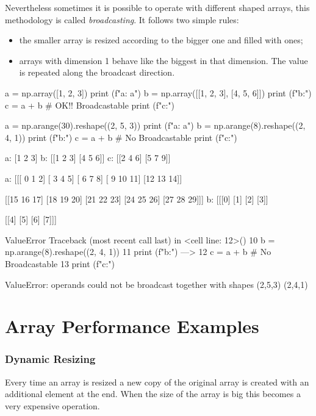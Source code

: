 Nevertheless sometimes it is possible to operate with different shaped arrays, this methodology is called \emph{broadcasting}. It follows two simple rules:
\begin{itemize}
\item the smaller array is resized according to the bigger one and filled with ones;
\item arrays with dimension 1 behave like the biggest in that dimension. The value is repeated along the broadcast direction.
\end{itemize}

\begin{ipythonnon}
a = np.array([1, 2, 3])
print (f"a: {a}")
b = np.array([[1, 2, 3], [4, 5, 6]])
print (f"b:")
c = a + b # OK!! Broadcastable
print (f"c:")
 
a = np.arange(30).reshape((2, 5, 3))
print (f"a: {a}")
b = np.arange(8).reshape((2, 4, 1)) 
print (f"b:")
c = a + b # No Broadcastable
print (f"c:")
\end{ipythonnon}
\begin{ioutput}
a: [1 2 3]
b:
[[1 2 3]
 [4 5 6]]
c:
[[2 4 6]
 [5 7 9]]
 
a: [[[ 0  1  2]
     [ 3  4  5]
     [ 6  7  8]
     [ 9 10 11]
     [12 13 14]]

    [[15 16 17]
     [18 19 20]
     [21 22 23]
     [24 25 26]
     [27 28 29]]]
b:
[[[0]
  [1]
  [2]
  [3]]

 [[4]
  [5]
  [6]
  [7]]]

ValueError
Traceback (most recent call last) in <cell line: 12>()
     10 b = np.arange(8).reshape((2, 4, 1))
     11 print (f"b:")
---> 12 c = a + b # No Broadcastable
     13 print (f"c:")

ValueError: operands could not be broadcast together with shapes 
(2,5,3) (2,4,1) 
\end{ioutput}

\section{Array Performance Examples}

\subsubsection{Dynamic Resizing}
Every time an array is resized a new copy of the original array is created with an additional element at the end. When the size of the array is big this becomes a very expensive operation.

